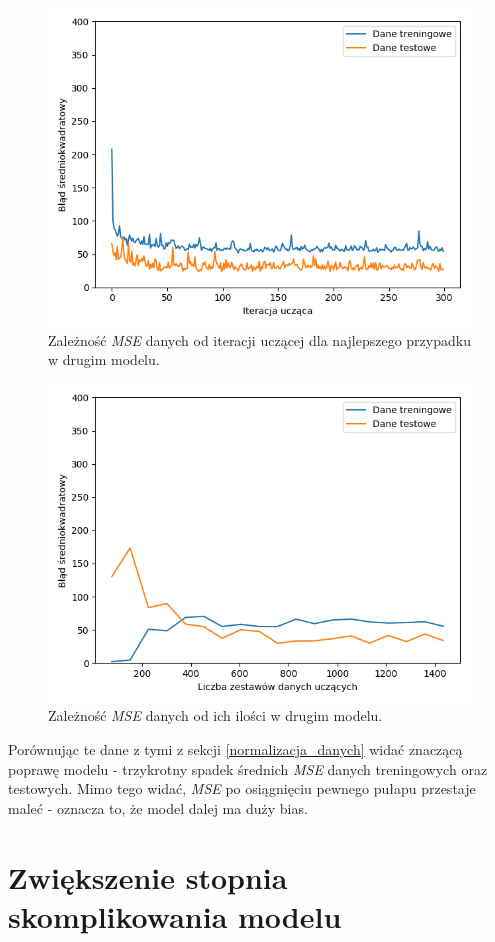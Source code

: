 \documentclass[12pt]{aghdpl}
\newenvironment{tightcenter}{
  \setlength\topsep{0pt}
  \setlength\parskip{0pt}
  \begin{center}
}{
  \end{center}
}
\begin{document}
		\begin{figure}[h]
			\begin{tightcenter}
	 			\includegraphics[width = 0.75\linewidth]{rysunki/drugi_model_wykres_uczenia.png}
	 		\end{tightcenter}
	 		
 			\caption{Zależność \textit{MSE} danych od iteracji uczącej dla najlepszego przypadku w drugim modelu.}
			\label{fig: drugi_model_wykres_uczenia}
		\end{figure}
		
		\begin{figure}[h]
			\begin{tightcenter}
	 			\includegraphics[width = 0.75\linewidth]{rysunki/drugi_model_learning_curves.png}
	 		\end{tightcenter}
	 		
 			\caption{Zależność \textit{MSE} danych od ich ilości w drugim modelu.}
			\label{fig: drugi_model_learning_curves}
		\end{figure}
		
		Porównując te dane z tymi z sekcji \ref{normalizacja_danych} widać znaczącą poprawę modelu - trzykrotny spadek średnich \textit{MSE} danych treningowych oraz testowych. Mimo tego widać, \textit{MSE} po osiągnięciu pewnego pułapu przestaje maleć - oznacza to, że model dalej ma duży bias.
		
		\section{Zwiększenie stopnia skomplikowania modelu}
		
		\printbibliography
\end{document}
